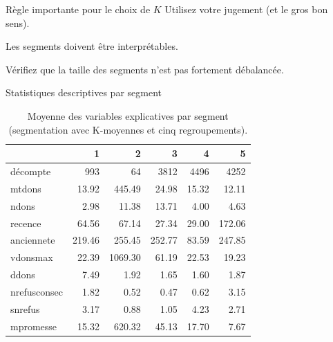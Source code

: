 \documentclass[
  ignorenonframetext,
]{beamer}
\begin{document}
\begin{frame}{Règle importante pour le choix de \(K\)}
\protect\hypertarget{ruxe8gle-importante-pour-le-choix-de-k}{}
Utilisez votre jugement (et le gros bon sens).

Les segments doivent être interprétables.

Vérifiez que la taille des segments n'est pas fortement débalancée.
\end{frame}

\begin{frame}{Statistiques descriptives par segment}
\protect\hypertarget{statistiques-descriptives-par-segment}{}
\footnotesize

\hypertarget{tbl-kmoy5resume}{}
\begin{table}
\caption{\label{tbl-kmoy5resume}Moyenne des variables explicatives par segment (segmentation avec
K-moyennes et cinq regroupements). }\tabularnewline

\centering
\begin{tabular}{lrrrrr}
\toprule
  & 1 & 2 & 3 & 4 & 5\\
\midrule
décompte & 993 & 64 & 3812 & 4496 & 4252\\
mtdons & 13.92 & 445.49 & 24.98 & 15.32 & 12.11\\
ndons & 2.98 & 11.38 & 13.71 & 4.00 & 4.63\\
recence & 64.56 & 67.14 & 27.34 & 29.00 & 172.06\\
anciennete & 219.46 & 255.45 & 252.77 & 83.59 & 247.85\\
vdonsmax & 22.39 & 1069.30 & 61.19 & 22.53 & 19.23\\
ddons & 7.49 & 1.92 & 1.65 & 1.60 & 1.87\\
nrefusconsec & 1.82 & 0.52 & 0.47 & 0.62 & 3.15\\
snrefus & 3.17 & 0.88 & 1.05 & 4.23 & 2.71\\
mpromesse & 15.32 & 620.32 & 45.13 & 17.70 & 7.67\\
\bottomrule
\end{tabular}
\end{table}
\end{frame}
\end{document}
